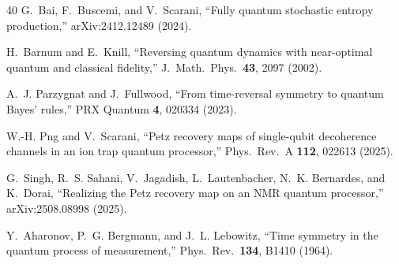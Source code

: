 \documentclass[prl,twocolumn,superscriptaddress,longbibliography,floatfix]{revtex4-2}
\begin{document}
\begin{thebibliography}{40}
G.~Bai, F.~Buscemi, and V.~Scarani,
``Fully quantum stochastic entropy production,''
arXiv:2412.12489 (2024).

H.~Barnum and E.~Knill,
``Reversing quantum dynamics with near-optimal quantum and classical
fidelity,''
J.\ Math.\ Phys.\ \textbf{43}, 2097 (2002).

A.~J. Parzygnat and J.~Fullwood,
``From time-reversal symmetry to quantum Bayes' rules,''
PRX Quantum \textbf{4}, 020334 (2023).

W.-H. Png and V.~Scarani,
``Petz recovery maps of single-qubit decoherence channels in an
ion trap quantum processor,''
Phys.\ Rev.\ A \textbf{112}, 022613 (2025).

G.~Singh, R.~S. Sahani, V.~Jagadish, L.~Lautenbacher,
N.~K. Bernardes, and K.~Dorai,
``Realizing the Petz recovery map on an NMR quantum processor,''
arXiv:2508.08998 (2025).

Y.~Aharonov, P.~G. Bergmann, and J.~L. Lebowitz,
``Time symmetry in the quantum process of measurement,''
Phys.\ Rev.\ \textbf{134}, B1410 (1964).

\end{thebibliography}
\end{document}
